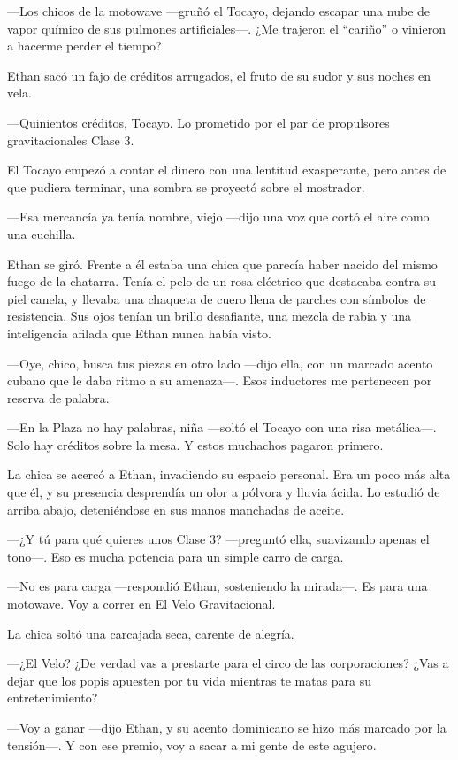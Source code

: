 \documentclass[12pt,a4paper]{book}
\begin{document}
---Los chicos de la motowave ---gruñó el Tocayo, dejando escapar una nube de vapor químico de sus pulmones artificiales---. ¿Me trajeron el ``cariño'' o vinieron a hacerme perder el tiempo?

Ethan sacó un fajo de créditos arrugados, el fruto de su sudor y sus noches en vela.

---Quinientos créditos, Tocayo. Lo prometido por el par de propulsores gravitacionales Clase 3.

El Tocayo empezó a contar el dinero con una lentitud exasperante, pero antes de que pudiera terminar, una sombra se proyectó sobre el mostrador.

---Esa mercancía ya tenía nombre, viejo ---dijo una voz que cortó el aire como una cuchilla.

Ethan se giró. Frente a él estaba una chica que parecía haber nacido del mismo fuego de la chatarra. Tenía el pelo de un rosa eléctrico que destacaba contra su piel canela, y llevaba una chaqueta de cuero llena de parches con símbolos de resistencia. Sus ojos tenían un brillo desafiante, una mezcla de rabia y una inteligencia afilada que Ethan nunca había visto.

---Oye, chico, busca tus piezas en otro lado ---dijo ella, con un marcado acento cubano que le daba ritmo a su amenaza---. Esos inductores me pertenecen por reserva de palabra.

---En la Plaza no hay palabras, niña ---soltó el Tocayo con una risa metálica---. Solo hay créditos sobre la mesa. Y estos muchachos pagaron primero.

La chica se acercó a Ethan, invadiendo su espacio personal. Era un poco más alta que él, y su presencia desprendía un olor a pólvora y lluvia ácida. Lo estudió de arriba abajo, deteniéndose en sus manos manchadas de aceite.

---¿Y tú para qué quieres unos Clase 3? ---preguntó ella, suavizando apenas el tono---. Eso es mucha potencia para un simple carro de carga.

---No es para carga ---respondió Ethan, sosteniendo la mirada---. Es para una motowave. Voy a correr en El Velo Gravitacional.

La chica soltó una carcajada seca, carente de alegría.

---¿El Velo? ¿De verdad vas a prestarte para el circo de las corporaciones? ¿Vas a dejar que los popis apuesten por tu vida mientras te matas para su entretenimiento?

---Voy a ganar ---dijo Ethan, y su acento dominicano se hizo más marcado por la tensión---. Y con ese premio, voy a sacar a mi gente de este agujero.
\end{document}
